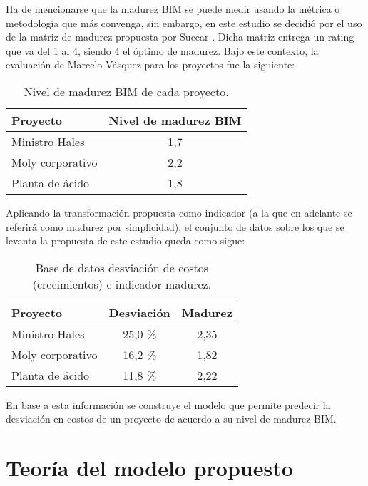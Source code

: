 Ha de mencionarse que la madurez BIM se puede medir usando la métrica o metodología que más convenga, sin embargo, en este estudio se decidió por el uso de la matriz de madurez propuesta por Succar \cite{succar2010building}. Dicha matriz entrega un rating que va del 1 al 4, siendo 4 el óptimo de madurez. Bajo este contexto, la evaluación de Marcelo Vásquez para los proyectos fue la siguiente:

\begin{table}[H]
    \centering
    \label{tab.datos_mad_bim}
    \caption{Nivel de madurez BIM de cada proyecto.}
    \begin{tabular}{lc}
        \toprule 
        \textbf{Proyecto} & \textbf{Nivel de madurez BIM} \\
        \midrule
        Ministro Hales & 1,7 \\
        Moly corporativo & 2,2 \\
        Planta de ácido &  1,8 \\
        \bottomrule
    \end{tabular}
\end{table}

Aplicando la transformación propuesta como indicador (a la que en adelante se referirá como madurez por simplicidad), el conjunto de datos sobre los que se levanta la propuesta de este estudio queda como sigue:

\begin{table}[H]
    \centering
    \label{tab.datos_mad_bim_desv}
    \caption{Base de datos desviación de costos (crecimientos) e indicador madurez.}
    \begin{tabular}{lcc}
        \toprule 
        \textbf{Proyecto}  & \textbf{Desviación} & \textbf{Madurez} \\
        \midrule
        Ministro Hales     & 25,0 \%             & 2,35 \\
        Moly corporativo   & 16,2 \%             & 1,82 \\
        Planta de ácido    & 11,8 \%             & 2,22 \\
        \bottomrule
    \end{tabular}
\end{table}


En base a esta información se construye el modelo que permite predecir la desviación en costos de un proyecto de acuerdo a su nivel de madurez BIM.

\section{Teoría del modelo propuesto}

